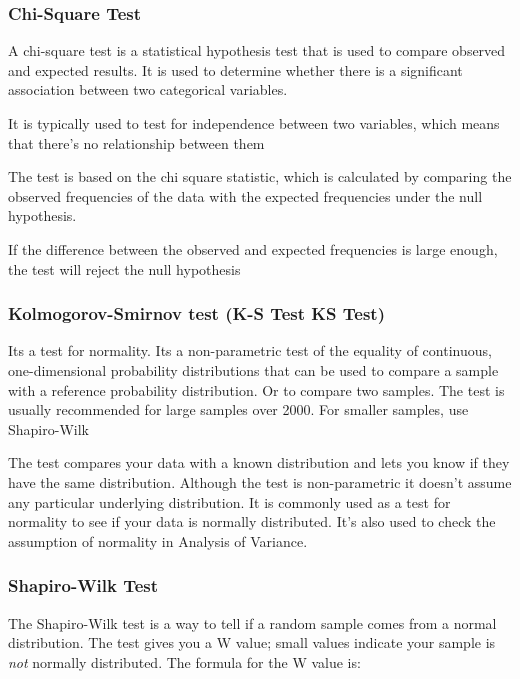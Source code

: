 \documentclass[11pt]{article}
\begin{document}
\hypertarget{chi-square-test}{%
\subsubsection{Chi-Square Test}\label{chi-square-test}}

A chi-square test is a statistical hypothesis test that is used to
compare observed and expected results. It is used to determine whether
there is a significant association between two categorical variables.

It is typically used to test for independence between two variables,
which means that there's no relationship between them

The test is based on the chi square statistic, which is calculated by
comparing the observed frequencies of the data with the expected
frequencies under the null hypothesis.

If the difference between the observed and expected frequencies is large
enough, the test will reject the null hypothesis

\hypertarget{kolmogorov-smirnov-test-k-s-test-ks-test}{%
\subsubsection{Kolmogorov-Smirnov test (K-S Test \textbar{} KS
Test)}\label{kolmogorov-smirnov-test-k-s-test-ks-test}}

Its a test for normality. Its a non-parametric test of the equality of
continuous, one-dimensional probability distributions that can be used
to compare a sample with a reference probability distribution. Or to
compare two samples. The test is usually recommended for large samples
over 2000. For smaller samples, use Shapiro-Wilk

The test compares your data with a known distribution and lets you know
if they have the same distribution. Although the test is non-parametric
it doesn't assume any particular underlying distribution. It is commonly
used as a test for normality to see if your data is normally
distributed. It's also used to check the assumption of normality in
Analysis of Variance.

\hypertarget{shapiro-wilk-test}{%
\subsubsection{Shapiro-Wilk Test}\label{shapiro-wilk-test}}

The Shapiro-Wilk test is a way to tell if a random sample comes from a
normal distribution. The test gives you a W value; small values indicate
your sample is \emph{not} normally distributed. The formula for the W
value is: 
\end{document}
